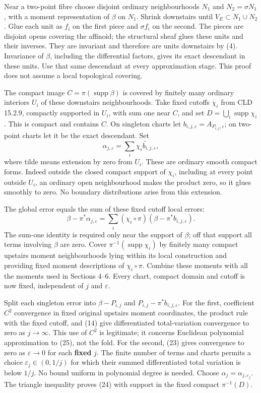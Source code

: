 \documentclass[
  11pt,
]{article}
\begin{document}
Near a two-point fibre choose disjoint ordinary neighbourhoods \(N_1\)
and \(N_2=\sigma N_1\), with a moment representation of \(\beta\) on
\(N_1\). Shrink downstairs until \(V_E\subset N_1\cup N_2\). Glue each
unit as \(f_i\) on the first piece and \(\sigma f_i\) on the second. The
pieces are disjoint opens covering the affinoid; the structural sheaf
glues these units and their inverses. They are invariant and therefore
are units downstairs by (4). Invariance of \(\beta\), including the
differential factors, gives its exact descendant in these units. Use
that same descendant at every approximation stage. This proof does not
assume a local topological covering.

The compact image \(C=\pi(\operatorname{supp}\beta)\) is covered by
finitely many ordinary interiors \(U_i\) of these downstairs
neighbourhoods. Take fixed cutoffs \(\chi_i\) from CLD 15.2.9, compactly
supported in \(U_i\), with sum one near \(C\), and set
\(D=\bigcup_i\operatorname{supp}\chi_i\). This is compact and contains
\(C\). On singleton charts let
\(b_{i,j,\varepsilon}=A_{P_{i,j},\varepsilon}\); on two-point charts let
it be the exact descendant. Set \[
 \alpha_{j,\varepsilon}=
        \sum_i\widetilde{\chi_i b_{i,j,\varepsilon}},        \tag{26}
\] where tilde means extension by zero from \(U_i\). These are ordinary
smooth compact forms. Indeed outside the closed compact support of
\(\chi_i\), including at every point outside \(U_i\), an ordinary open
neighbourhood makes the product zero, so it glues smoothly to zero. No
boundary distributions arise from this extension.

The global error equals the sum of these fixed cutoff local errors: \[
 \beta-\pi^*\alpha_{j,\varepsilon}
     =\sum_i(\chi_i\circ\pi)
                  (\beta-\pi^*b_{i,j,\varepsilon}).         \tag{27}
\] The sum-one identity is required only near the support of \(\beta\);
off that support all terms involving \(\beta\) are zero. Cover
\(\pi^{-1}(\operatorname{supp}\chi_i)\) by finitely many compact
upstairs moment neighbourhoods lying within its local construction and
providing fixed moment descriptions of \(\chi_i\circ\pi\). Combine these
moments with all the moments used in Sections 4--6. Every chart, compact
domain and cutoff is now fixed, independent of \(j\) and
\(\varepsilon\).

Split each singleton error into \(\beta-P_{i,j}\) and
\(P_{i,j}-\pi^*b_{i,j,\varepsilon}\). For the first, coefficient \(C^2\)
convergence in fixed original upstairs moment coordinates, the product
rule with the fixed cutoff, and (14) give differentiated total-variation
convergence to zero as \(j\to\infty\). This use of \(C^2\) is
legitimate; it concerns Euclidean polynomial approximation to (25), not
the fold. For the second, (23) gives convergence to zero as
\(\varepsilon\to0\) for each \textbf{fixed} \(j\). The finite number of
terms and charts permits a choice \(\varepsilon_j\in(0,1/j)\) for which
their summed differentiated total variation is below \(1/j\). No bound
uniform in polynomial degree is needed. Choose
\(\alpha_j=\alpha_{j,\varepsilon_j}\). The triangle inequality proves
(24) with support in the fixed compact \(\pi^{-1}(D)\).
\end{document}
